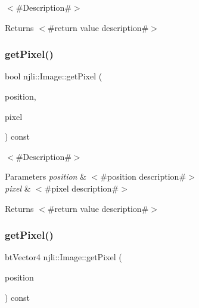 $<$\#\+Description\#$>$

\begin{DoxyReturn}{Returns}
$<$\#return value description\#$>$ 
\end{DoxyReturn}
\mbox{\label{classnjli_1_1_image_add817e9d5d8ce5e0fb9913c8c0c78f9b}} 
\subsubsection{\texorpdfstring{get\+Pixel()}{getPixel()}\hspace{0.1cm}{\footnotesize\ttfamily [1/2]}}
{\footnotesize\ttfamily bool njli\+::\+Image\+::get\+Pixel (\begin{DoxyParamCaption}\item[{const bt\+Vector2 \&}]{position,  }\item[{bt\+Vector4 \&}]{pixel }\end{DoxyParamCaption}) const}

$<$\#\+Description\#$>$


\begin{DoxyParams}{Parameters}
{\em position} & $<$\#position description\#$>$ \\
\hline
{\em pixel} & $<$\#pixel description\#$>$\\
\hline
\end{DoxyParams}
\begin{DoxyReturn}{Returns}
$<$\#return value description\#$>$ 
\end{DoxyReturn}
\mbox{\label{classnjli_1_1_image_acc74a1af9db48b1631359fb3aa54e66c}} 
\subsubsection{\texorpdfstring{get\+Pixel()}{getPixel()}\hspace{0.1cm}{\footnotesize\ttfamily [2/2]}}
{\footnotesize\ttfamily bt\+Vector4 njli\+::\+Image\+::get\+Pixel (\begin{DoxyParamCaption}\item[{const bt\+Vector2 \&}]{position }\end{DoxyParamCaption}) const}

